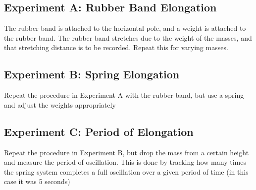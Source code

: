 \documentclass[12pt]{article}
\begin{document}
        \subsection{Experiment A: Rubber Band Elongation}
            The rubber band is attached to the horizontal pole, and a weight
            is attached to the rubber band. The rubber band stretches due to
            the weight of the masses, and that stretching distance is to be
            recorded. Repeat this for varying masses.
        \subsection{Experiment B: Spring Elongation}
            Repeat the procedure in Experiment A with the rubber band, but use
            a spring and adjust the weights appropriately
        \subsection{Experiment C: Period of Elongation}
            Repeat the procedure in Experiment B, but drop the mass from a
            certain height and measure the period of oscillation. This is done
            by tracking how many times the spring system completes a full 
            oscillation over a given period of time (in this case it was 5
            seconds)
\end{document}
